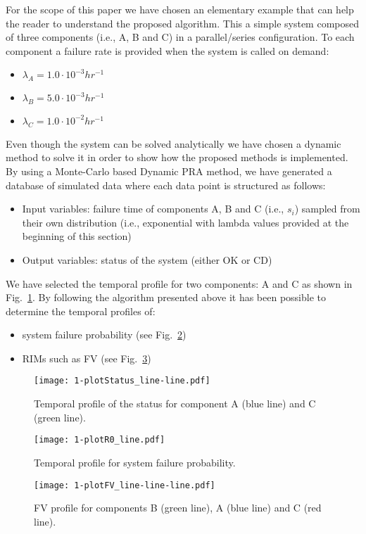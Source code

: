 For the scope of this paper we have chosen an elementary example that can help the reader to 
understand the proposed algorithm. This a simple system composed of three components 
(i.e., A, B and C) in a parallel/series configuration. To each component a failure rate is 
provided when the system is called on demand:
\begin{itemize}
  \item $\lambda_A=1.0 \cdot 10^{-3} hr^{-1}$
  \item $\lambda_B=5.0 \cdot 10^{-3} hr^{-1}$
  \item $\lambda_C=1.0 \cdot 10^{-2} hr^{-1}$
\end{itemize}
  
Even though the system can be solved analytically we have chosen a dynamic method to solve it in 
order to show how the proposed methods is implemented. 
By using a Monte-Carlo based Dynamic PRA method, we have generated a database of simulated data 
where each data point is structured as follows:
\begin{itemize}
  \item Input variables: failure time of components A, B and C (i.e., $s_i$) sampled from their 
        own distribution (i.e., exponential with lambda values provided at the beginning of this section)
  \item Output variables: status of the system (either OK or CD)
\end{itemize}

We have selected the temporal profile for two components: A and C as shown in Fig.~\ref{fig:plotStatus_line-line}. 
By following the algorithm presented above it has been possible to determine the temporal profiles of:
\begin{itemize}
  \item system failure probability (see Fig.~\ref{fig:plotR0_line})
  \item RIMs such as FV (see Fig.~\ref{fig:plotFV_line-line-line}) 
\end{itemize}

\begin{figure}
    \centering
    \centerline{\texttt{[image: 1-plotStatus\_line-line.pdf]}}
    \caption{Temporal profile of the status for component A (blue line) and C (green line).}
    \label{fig:plotStatus_line-line}
\end{figure}

\begin{figure}
    \centering
    \centerline{\texttt{[image: 1-plotR0\_line.pdf]}}
    \caption{Temporal profile for system failure probability.}
    \label{fig:plotR0_line}
\end{figure}

\begin{figure}
    \centering
    \centerline{\texttt{[image: 1-plotFV\_line-line-line.pdf]}}
    \caption{FV profile for components B (green line), A (blue line) and C (red line).}
    \label{fig:plotFV_line-line-line}
\end{figure}


